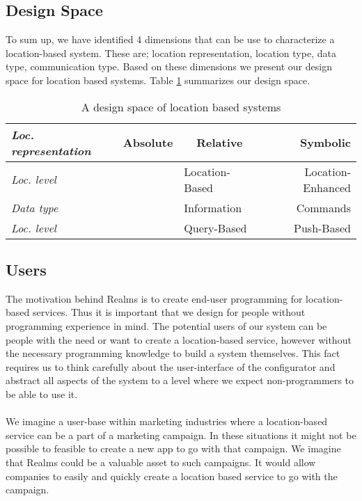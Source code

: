 \subsection{Design Space} %
\label{sub:design_space}
To sum up, we have identified 4 dimensions that can be use to characterize a location-based system. These are; location representation, location type, data type, communication type. Based on these dimensions we present our design space for location based systems. Table \ref{tab:designspace} summarizes our design space.
\begin{table}
\begin{tabular}{|l|l|c|r|}
  \hline
  \emph{Loc. representation} & Absolute & Relative & Symbolic \\ \hline
  \emph{Loc. level} & \multicolumn{1}{l}{} & \multicolumn{1}{l|}{Location-Based} & \multicolumn{1}{r|}{Location-Enhanced} \\ \hline
  \emph{Data type} & \multicolumn{1}{l}{} & \multicolumn{1}{l|}{Information} & \multicolumn{1}{r|}{Commands} \\ \hline
  \emph{Loc. level} & \multicolumn{1}{l}{} & \multicolumn{1}{l|}{Query-Based} & \multicolumn{1}{r|}{Push-Based} \\
  \hline
\end{tabular}
	\caption{A design space of location based systems}
  \label{tab:designspace}
\end{table}


\subsection{Users} %
\label{sub:users}
The motivation behind Realms is to create end-user programming for location-based services. Thus it is important that we design for people without programming experience in mind. The potential users of our system can be people with the need or want to create a location-based service, however without the necessary programming knowledge to build a system themselves. This fact requires us to think carefully about the user-interface of the configurator and abstract all aspects of the system to a level where we expect non-programmers to be able to use it. 
\\\\
We imagine a user-base within marketing industries where a location-based service can be a part of a marketing campaign. In these situations it might not be possible to feasible to create a new app to go with that campaign. We imagine that Realms could be a valuable asset to such campaigns. It would allow companies to easily and quickly create a location based service to go with the campaign. 

